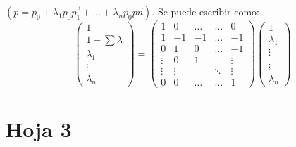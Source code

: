 \documentclass[10pt,a4paper,openright]{book}
\theoremstyle{break}
\begin{document}
$\left( p = p_0 + \lambda_1 \overrightarrow{p_0p_1} + \ldots + \lambda_n \overrightarrow{p_0pn} \right)$.  Se puede escribir como: 
\[
    \begin{pmatrix} 1\\ 1 - \sum \lambda\\ \lambda_1\\ \vdots\\ \lambda_n \end{pmatrix} =
    \begin{pmatrix} 1 & 0 & \ldots & \ldots & 0\\ 
        1 & -1 & -1 & \ldots & -1\\ 
        0 & 1 & 0 & \ldots & -1\\ 
        \vdots & 0 & 1 &   & \vdots\\ 
        \vdots & \vdots &  & \ddots & \vdots\\ 
        0 & 0 & \ldots & \ldots & 1 \end{pmatrix} 
    \begin{pmatrix} 1\\ \lambda_1\\ \vdots\\ \\ \vdots\\ \lambda_n \end{pmatrix} 
\]

\chapter{Hoja 3}%
\label{cha:hoja_3}
\end{document}
